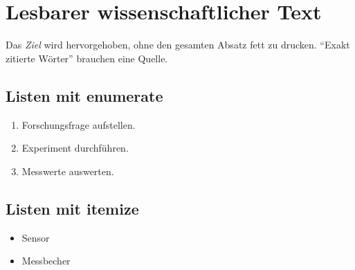 \documentclass{scrartcl}
\begin{document}
\section{Lesbarer wissenschaftlicher Text}
Das \emph{Ziel} wird hervorgehoben, ohne den gesamten Absatz fett zu drucken.
\newline
\enquote{Exakt zitierte Wörter} brauchen eine Quelle.

\subsection{Listen mit enumerate}
\begin{enumerate}
  \item Forschungsfrage aufstellen.
  \item Experiment durchführen.
  \item Messwerte auswerten.
\end{enumerate}

\subsection{Listen mit itemize}
\begin{itemize}[label=\tiny$\blacksquare$]
	
  \item Sensor
  \item Messbecher
\end{itemize}
\end{document}

